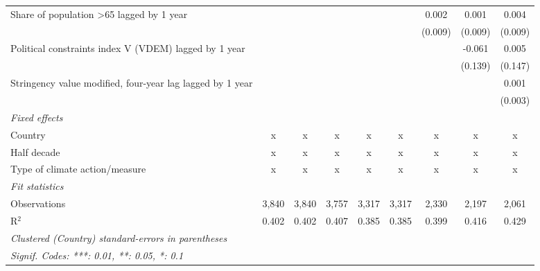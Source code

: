\begin{tabular}{lcccccccc}
   Share of population >65 lagged by 1 year                  &               &               &                &                &                & 0.002         & 0.001          & 0.004\\   
                                                             &               &               &                &                &                & (0.009)       & (0.009)        & (0.009)\\   
   Political constraints index V (VDEM) lagged by 1 year     &               &               &                &                &                &               & -0.061         & 0.005\\   
                                                             &               &               &                &                &                &               & (0.139)        & (0.147)\\   
   Stringency value modified, four-year lag lagged by 1 year &               &               &                &                &                &               &                & 0.001\\   
                                                             &               &               &                &                &                &               &                & (0.003)\\   
   \emph{Fixed effects}\\
   Country                                                   & x             & x             & x              & x              & x              & x             & x              & x\\  
   Half decade                                               & x             & x             & x              & x              & x              & x             & x              & x\\  
   Type of climate action/measure                            & x             & x             & x              & x              & x              & x             & x              & x\\  
   \midrule \emph{Fit statistics}\\
   Observations                                              & 3,840         & 3,840         & 3,757          & 3,317          & 3,317          & 2,330         & 2,197          & 2,061\\  
   R$^2$                                                     & 0.402         & 0.402         & 0.407          & 0.385          & 0.385          & 0.399         & 0.416          & 0.429\\  
   \midrule
   \multicolumn{9}{l}{\emph{Clustered (Country) standard-errors in parentheses}}\\
   \multicolumn{9}{l}{\emph{Signif. Codes: ***: 0.01, **: 0.05, *: 0.1}}\\
\end{tabular}
\par\endgroup


